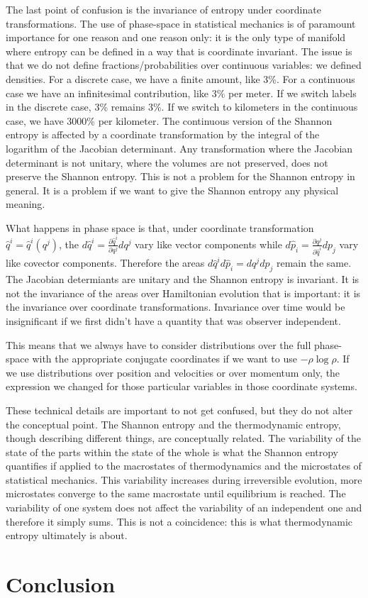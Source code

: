 \documentclass{article}
\begin{document}
The last point of confusion is the invariance of entropy under coordinate transformations. The use of phase-space in statistical mechanics is of paramount importance for one reason and one reason only: it is the only type of manifold where entropy can be defined in a way that is coordinate invariant. The issue is that we do not define fractions/probabilities over continuous variables: we defined densities. For a discrete case, we have a finite amount, like 3\%. For a continuous case we have an infinitesimal contribution, like 3\% per meter. If we switch labels in the discrete case, 3\% remains 3\%. If we switch to kilometers in the continuous case, we have 3000\% per kilometer. The continuous version of the Shannon entropy is affected by a coordinate transformation by the integral of the logarithm of the Jacobian determinant. Any transformation where the Jacobian determinant is not unitary, where the volumes are not preserved, does not preserve the Shannon entropy. This is not a problem for the Shannon entropy in general. It is a problem if we want to give the Shannon entropy any physical meaning.

What happens in phase space is that, under coordinate transformation $\hat{q}^i = \hat{q}^i(q^j)$, the $d\hat{q}^i = \frac{\partial \hat{q}^i}{\partial q^j } dq^j$ vary like vector components while $d\hat{p}_i = \frac{\partial q^j}{\partial \hat{q}^i } dp_j$ vary like covector components. Therefore the areas $d\hat{q}^i d\hat{p}_i = dq^j dp_j$ remain the same. The Jacobian determiants are unitary and the Shannon entropy is invariant. It is not the invariance of the areas over Hamiltonian evolution that is important: it is the invariance over coordinate transformations. Invariance over time would be insignificant if we first didn't have a quantity that was observer independent.

This means that we always have to consider distributions over the full phase-space with the appropriate conjugate coordinates if we want to use $-\rho \log \rho$. If we use distributions over position and velocities or over momentum only, the expression we changed for those particular variables in those coordinate systems.

These technical details are important to not get confused, but they do not alter the conceptual point. The Shannon entropy and the thermodynamic entropy, though describing different things, are conceptually related. The variability of the state of the parts within the state of the whole is what the Shannon entropy quantifies if applied to the macrostates of thermodynamics and the microstates of statistical mechanics. This variability increases during irreversible evolution, more microstates converge to the same macrostate until equilibrium is reached. The variability of one system does not affect the variability of an independent one and therefore it simply sums. This is not a coincidence: this is what thermodynamic entropy ultimately is about.


\section{Conclusion}

  

\end{document}
